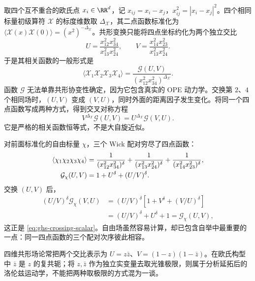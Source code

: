 取四个互不重合的欧氏点 $x_i\in\RR^d$，记 $x_{ij}=x_i-x_j$，$x_{ij}^2=|x_i-x_j|^2$。四个相同标量初级算符 $\mathcal X$ 的标度维数取 $\Delta_\mathcal X$，其二点函数标准化为 $\langle\mathcal X(x)\mathcal X(0)\rangle=(x^2)^{-\Delta_\mathcal X}$。共形变换只能将四点坐标约化为两个独立交比
\begin{equation}\label{eq:ghs-cross-ratios}
 U=\frac{x_{12}^2x_{34}^2}{x_{13}^2x_{24}^2},
 \qquad V=\frac{x_{14}^2x_{23}^2}{x_{13}^2x_{24}^2}.
\end{equation}
于是其相关函数的一般形式是
\begin{equation}\label{eq:ghs-fourpoint-reduced}
 \langle\mathcal X_1\mathcal X_2\mathcal X_3\mathcal X_4\rangle
 =\frac{\mathcal G(U,V)}{(x_{12}^2x_{34}^2)^{\Delta_\mathcal X}}.
\end{equation}
函数 $\mathcal G$ 无法单靠共形协变性确定，因为它包含真实的 OPE 动力学。交换第 $2$、$4$ 个相同场时，$(U,V)$ 变成 $(V,U)$，同时外面的距离因子发生变化。将同一个四点函数写成两种方式，得到交叉对称方程
\begin{equation}\label{eq:ghs-crossing-scalar}
 V^{\Delta_\mathcal X}\mathcal G(U,V)
 =U^{\Delta_\mathcal X}\mathcal G(V,U).
\end{equation}
它是严格的相关函数恒等式，不是大自旋近似。


对前面标准化的自由标量 $\chi$，三个 Wick 配对穷尽了四点函数：
\begin{align}\label{eq:ghs-free-scalar-fourpoint}
 \langle\chi_1\chi_2\chi_3\chi_4\rangle
 &=\frac1{(x_{12}^2x_{34}^2)^\delta}
 +\frac1{(x_{13}^2x_{24}^2)^\delta}
 +\frac1{(x_{14}^2x_{23}^2)^\delta},\\
 \mathcal G_\chi(U,V)&=1+U^\delta+(U/V)^\delta.\notag
\end{align}
交换 $(U,V)$ 后，
\begin{align*}
 (U/V)^\delta\mathcal G_\chi(V,U)
 &=(U/V)^\delta[1+V^\delta+(V/U)^\delta]\\
 &=(U/V)^\delta+U^\delta+1
 =\mathcal G_\chi(U,V),
\end{align*}
这正是 \cref{eq:ghs-crossing-scalar}。自由场虽然容易计算，却已包含自举中最重要的一点：同一四点函数的三个配对次序彼此相容。

四维共形场论常把两个交比表示为 $U=z\bar z$、$V=(1-z)(1-\bar z)$。在欧氏构型中 $\bar z$ 是 $z$ 的复共轭；将 $z,\bar z$ 作为独立实变量去取光锥极限，则属于分析延拓后的洛伦兹运动学，不能把两种取极限的方式混为一谈。


